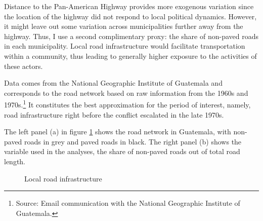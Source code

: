 \documentclass[12pt, notitlepage]{article}
\begin{document}
Distance to the Pan-American Highway provides more exogenous variation since the location of the highway did not respond to local political dynamics.
However, it might leave out some variation across municipalities further away from the highway.
Thus, I use a second complimentary proxy: the share of non-paved roads in each municipality.
Local road infrastructure would facilitate transportation within a community, thus leading to generally higher exposure to the activities of these actors.

Data comes from the National Geographic Institute of Guatemala \citep{Segeplan:2019aa} and corresponds to the road network based on raw information from the 1960s and 1970s.\footnote{Source: Email communication with the National Geographic Institute of Guatemala.}
It constitutes the best approximation for the period of interest, namely, road infrastructure right before the conflict escalated in the late 1970s.

The left panel (a) in figure \ref{fig:map_roads} shows the road network in Guatemala, with non-paved roads in grey and paved roads in black.
The right panel (b) shows the variable used in the analyses, the share of non-paved roads out of total road length.

\begin{figure}[!ht]
    \centering

    \begin{minipage}{1\textwidth}
      \centering
      \hspace{25pt}
    \end{minipage}

    \caption{Local road infrastructure} \label{fig:map_roads}

\end{figure}
\end{document}
